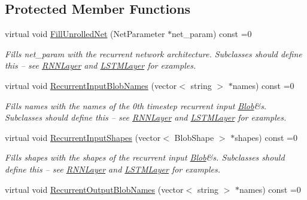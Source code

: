 \subsection*{Protected Member Functions}
\begin{DoxyCompactItemize}
\item 
virtual void \hyperlink{classcaffe_1_1RecurrentLayer_a04a3a032c4d0be559d88865a13a2d927}{Fill\+Unrolled\+Net} (Net\+Parameter $\ast$net\+\_\+param) const =0\hypertarget{classcaffe_1_1RecurrentLayer_a04a3a032c4d0be559d88865a13a2d927}{}\label{classcaffe_1_1RecurrentLayer_a04a3a032c4d0be559d88865a13a2d927}

\begin{DoxyCompactList}\small\item\em Fills net\+\_\+param with the recurrent network architecture. Subclasses should define this -- see \hyperlink{classcaffe_1_1RNNLayer}{R\+N\+N\+Layer} and \hyperlink{classcaffe_1_1LSTMLayer}{L\+S\+T\+M\+Layer} for examples. \end{DoxyCompactList}\item 
virtual void \hyperlink{classcaffe_1_1RecurrentLayer_a9d9dab800f838e38651678718adfbbf6}{Recurrent\+Input\+Blob\+Names} (vector$<$ string $>$ $\ast$names) const =0\hypertarget{classcaffe_1_1RecurrentLayer_a9d9dab800f838e38651678718adfbbf6}{}\label{classcaffe_1_1RecurrentLayer_a9d9dab800f838e38651678718adfbbf6}

\begin{DoxyCompactList}\small\item\em Fills names with the names of the 0th timestep recurrent input \hyperlink{classcaffe_1_1Blob}{Blob}\&s. Subclasses should define this -- see \hyperlink{classcaffe_1_1RNNLayer}{R\+N\+N\+Layer} and \hyperlink{classcaffe_1_1LSTMLayer}{L\+S\+T\+M\+Layer} for examples. \end{DoxyCompactList}\item 
virtual void \hyperlink{classcaffe_1_1RecurrentLayer_ad2c2427c11960e0b8961c31ff2f74c03}{Recurrent\+Input\+Shapes} (vector$<$ Blob\+Shape $>$ $\ast$shapes) const =0\hypertarget{classcaffe_1_1RecurrentLayer_ad2c2427c11960e0b8961c31ff2f74c03}{}\label{classcaffe_1_1RecurrentLayer_ad2c2427c11960e0b8961c31ff2f74c03}

\begin{DoxyCompactList}\small\item\em Fills shapes with the shapes of the recurrent input \hyperlink{classcaffe_1_1Blob}{Blob}\&s. Subclasses should define this -- see \hyperlink{classcaffe_1_1RNNLayer}{R\+N\+N\+Layer} and \hyperlink{classcaffe_1_1LSTMLayer}{L\+S\+T\+M\+Layer} for examples. \end{DoxyCompactList}\item 
virtual void \hyperlink{classcaffe_1_1RecurrentLayer_a5fd43ae201c4284a1cc3d93f72702bbe}{Recurrent\+Output\+Blob\+Names} (vector$<$ string $>$ $\ast$names) const =0\hypertarget{classcaffe_1_1RecurrentLayer_a5fd43ae201c4284a1cc3d93f72702bbe}{}\label{classcaffe_1_1RecurrentLayer_a5fd43ae201c4284a1cc3d93f72702bbe}


\end{DoxyCompactItemize}
